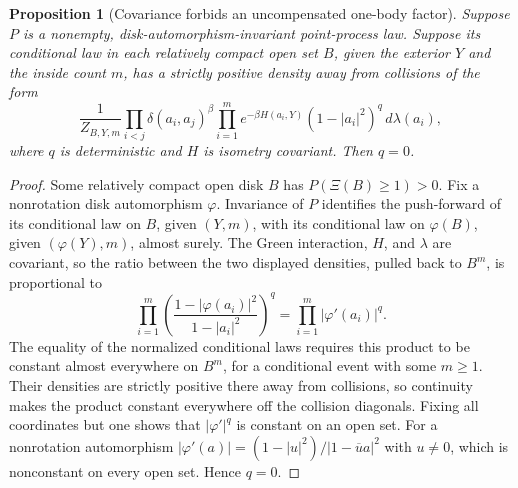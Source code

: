 \documentclass[11pt,a4paper]{article}
\numberwithin{equation}{section}
\newtheorem{proposition}[theorem]{Proposition}
\theoremstyle{definition}
\theoremstyle{remark}
\begin{document}
\begin{proposition}[Covariance forbids an uncompensated one-body factor]
\label{prop:invariance-forces-zero-one-body-exponent}
Suppose $P$ is a nonempty, disk-automorphism-invariant point-process
law. Suppose its conditional law in each relatively compact open set
$B$, given the exterior $Y$ and the inside count $m$, has a strictly
positive density away from collisions of the form
\begin{equation}
 \frac1{Z_{B,Y,m}}
 \prod_{i<j}\delta(a_i,a_j)^\beta
 \prod_{i=1}^m
       e^{-\beta H(a_i,Y)}(1-|a_i|^2)^q\,d\lambda(a_i),
 \label{eq:canonical-covariance-test}
\end{equation}
where $q$ is deterministic and $H$ is isometry covariant. Then $q=0$.
\end{proposition}

\begin{proof}
Some relatively compact open disk $B$ has
$P(\Xi(B)\ge1)>0$. Fix a nonrotation disk automorphism $\varphi$.
Invariance of $P$ identifies the push-forward of its conditional
law on $B$, given $(Y,m)$, with its conditional law on $\varphi(B)$,
given $(\varphi(Y),m)$, almost surely. The Green interaction, $H$,
and $\lambda$ are covariant, so the ratio between the two displayed
densities, pulled back to $B^m$, is proportional to
\[
 \prod_{i=1}^m\left(
    \frac{1-|\varphi(a_i)|^2}{1-|a_i|^2}\right)^q
 =\prod_{i=1}^m|\varphi'(a_i)|^q.
\]
The equality of the normalized conditional laws requires this product
to be constant almost everywhere on $B^m$, for a conditional event
with some $m\ge1$. Their densities are strictly positive there away
from collisions, so continuity makes the product constant everywhere
off the collision diagonals. Fixing all coordinates but one shows
that $|\varphi'|^q$ is constant on an open set. For a nonrotation
automorphism $|\varphi'(a)|=(1-|u|^2)/|1-\overline u a|^2$ with
$u\ne0$, which is nonconstant on every open set. Hence $q=0$.
\end{proof}
\end{document}
